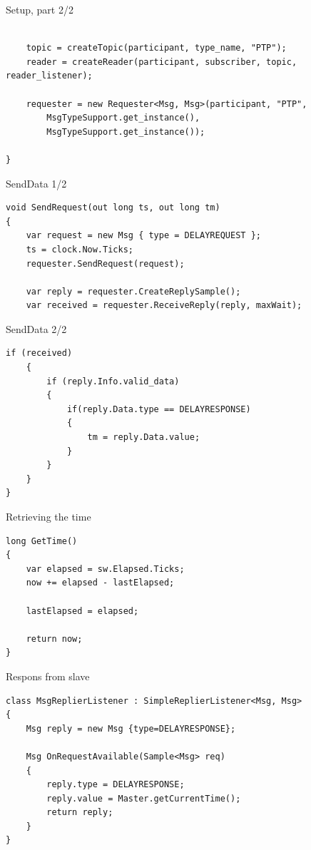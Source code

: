 \documentclass[compressed, presentation, notheorems, 12pt]{beamer}
\begin{document}
	\begin{frame}[containsverbatim]{Setup, part 2/2}
	\begin{lstlisting}[style=Code-C++]

	topic = createTopic(participant, type_name, "PTP");
	reader = createReader(participant, subscriber, topic, reader_listener);

	requester = new Requester<Msg, Msg>(participant, "PTP",
		MsgTypeSupport.get_instance(),
		MsgTypeSupport.get_instance());

}
	\end{lstlisting}
	\end{frame}



	\begin{frame}[containsverbatim]{SendData 1/2}
	\begin{lstlisting}[style=Code-C++]
void SendRequest(out long ts, out long tm)
{
	var request = new Msg { type = DELAYREQUEST };
	ts = clock.Now.Ticks;
	requester.SendRequest(request);

	var reply = requester.CreateReplySample();
	var received = requester.ReceiveReply(reply, maxWait);

	\end{lstlisting}
	\end{frame}



	\begin{frame}[containsverbatim]{SendData 2/2}
	\begin{lstlisting}[style=Code-C++]
	if (received)
	{
		if (reply.Info.valid_data)
		{
			if(reply.Data.type == DELAYRESPONSE)
			{
				tm = reply.Data.value;
			}
		}
	}
}
	\end{lstlisting}
	\end{frame}




	\begin{frame}[containsverbatim]{Retrieving the time}
	\begin{lstlisting}[style=Code-C++]
long GetTime()
{
	var elapsed = sw.Elapsed.Ticks;
	now += elapsed - lastElapsed;

	lastElapsed = elapsed;

	return now;
}
	\end{lstlisting}
	\end{frame}



	\begin{frame}[containsverbatim]{Respons from slave}
	\begin{lstlisting}[style=Code-C++]
class MsgReplierListener : SimpleReplierListener<Msg, Msg>
{
	Msg reply = new Msg {type=DELAYRESPONSE};

	Msg OnRequestAvailable(Sample<Msg> req)
	{
		reply.type = DELAYRESPONSE;
		reply.value = Master.getCurrentTime();
		return reply;
	}
}
	\end{lstlisting}

	\end{frame}
\end{document}
